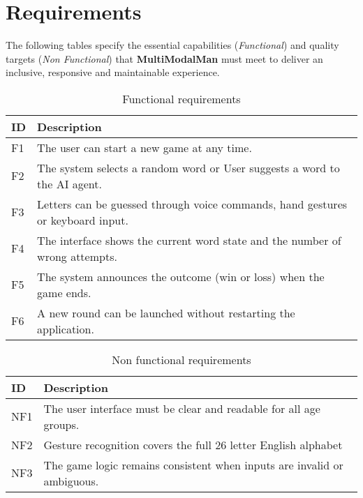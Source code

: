 \section{Requirements}
The following tables specify the essential capabilities (\textit{Functional}) and quality targets (\textit{Non Functional}) that \textbf{MultiModalMan} must meet to deliver an inclusive, responsive and maintainable experience.

\newpage
\begin{table}[ht]
\centering
\caption{Functional requirements}
\begin{tabularx}{\linewidth}{@{}lX@{}}
\toprule
\textbf{ID} & \textbf{Description} \\ \midrule
F1 & The user can start a new game at any time. \\
F2 & The system selects a random word or User suggests a word to the AI agent. \\
F3 & Letters can be guessed through voice commands, hand gestures or keyboard input. \\
F4 & The interface shows the current word state and the number of wrong attempts. \\
F5 & The system announces the outcome (win or loss) when the game ends. \\
F6 & A new round can be launched without restarting the application. \\ \bottomrule
\end{tabularx}
\end{table}

\begin{table}[ht]
\centering
\caption{Non functional requirements}
\begin{tabularx}{\linewidth}{@{}lX@{}}
\toprule
\textbf{ID} & \textbf{Description} \\ \midrule
NF1 & The user interface must be clear and readable for all age groups. \\
NF2 & Gesture recognition covers the full 26 letter English alphabet \\
NF3 & The game logic remains consistent when inputs are invalid or ambiguous. \\ \bottomrule
\end{tabularx}
\end{table}
